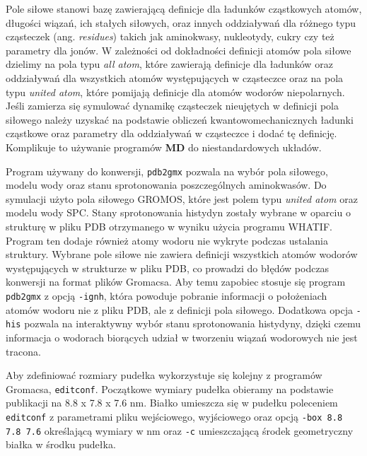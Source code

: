 Pole siłowe stanowi bazę zawierającą definicje dla ładunków cząstkowych atomów, długości wiązań, ich stałych siłowych, oraz innych oddziaływań dla różnego typu cząsteczek (ang. \textit{residues}) takich jak aminokwasy, nukleotydy, cukry czy też parametry dla jonów. W zależności od dokładności definicji atomów pola siłowe dzielimy na pola typu \textit{all atom}, które zawierają definicje dla ładunków oraz oddziaływań dla wszystkich atomów występujących w cząsteczce oraz na pola typu \textit{united atom}, które pomijają definicje dla atomów wodorów niepolarnych. Jeśli zamierza się symulować dynamikę cząsteczek nieujętych w definicji pola siłowego należy uzyskać na podstawie obliczeń kwantowomechanicznych ładunki cząstkowe oraz parametry dla oddziaływań w cząsteczce i dodać tę definicję. Komplikuje to używanie programów \textbf{MD} do niestandardowych układów.

Program używany do konwersji, \texttt{pdb2gmx} pozwala na wybór pola siłowego, modelu wody oraz stanu sprotonowania poszczególnych aminokwasów. Do symulacji użyto pola siłowego GROMOS, które jest polem typu \textit{united atom} oraz modelu wody SPC. Stany sprotonowania histydyn zostały wybrane w oparciu o strukturę w pliku PDB otrzymanego w wyniku użycia programu WHATIF. Program ten dodaje również atomy wodoru nie wykryte podczas ustalania struktury. Wybrane pole siłowe nie zawiera definicji wszystkich atomów wodorów występujących w strukturze w pliku PDB, co prowadzi do błędów podczas konwersji na format plików Gromacsa. Aby temu zapobiec stosuje się program \texttt{pdb2gmx} z opcją \texttt{-ignh}, która powoduje pobranie informacji o położeniach atomów wodoru nie z pliku PDB, ale z definicji pola siłowego. Dodatkowa opcja \texttt{-his} pozwala na interaktywny wybór stanu sprotonowania histydyny, dzięki czemu informacja o wodorach biorących udział w tworzeniu wiązań wodorowych nie jest tracona.

Aby zdefiniować rozmiary pudełka wykorzystuje się kolejny z programów Gromacsa, \texttt{editconf}. Początkowe wymiary pudełka obieramy na podstawie publikacji\cite{1tki} na 8.8 x 7.8 x 7.6 nm. Białko umieszcza się w pudełku poleceniem \texttt{editconf} z parametrami pliku wejściowego, wyjściowego oraz opcją \texttt{-box 8.8 7.8 7.6} określającą wymiary w nm oraz \texttt{-c} umieszczającą środek geometryczny białka w środku pudełka.


